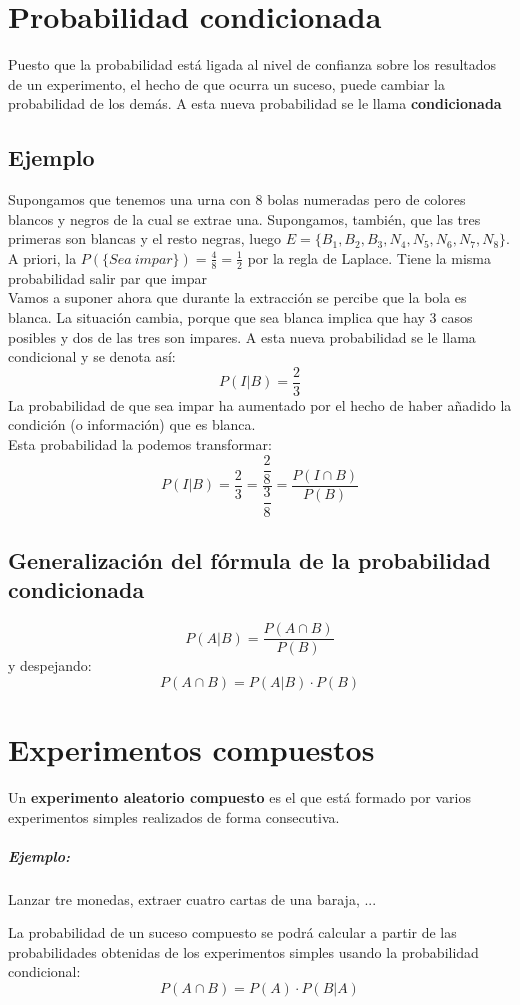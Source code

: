 \documentclass[a4paper,spanish,9pt]{extarticle}
\begin{document}
\begin{multicols*}{2}
\section{Probabilidad condicionada}

Puesto que la probabilidad está ligada al nivel de confianza sobre los resultados de un experimento, el hecho de que ocurra un suceso, puede cambiar la probabilidad de los demás. A esta nueva probabilidad se le llama \textbf{condicionada}
\subsection{Ejemplo}
 Supongamos que tenemos una urna con 8 bolas numeradas pero de colores blancos y negros de la cual se extrae una. Supongamos, también, que las tres primeras son blancas y el resto negras, luego  $E=\lbrace B_1,B_2, B_3, N_4, N_5, N_6, N_7, N_8\rbrace$.\\
 A priori, la $P(\lbrace Sea\ impar\rbrace )=\frac{4}{8}=\frac{1}{2}$ por la regla de Laplace. Tiene la misma probabilidad salir par que impar\\
 Vamos a suponer ahora que durante la extracción se percibe que la bola es blanca. La situación cambia, porque que sea blanca implica que hay 3 casos posibles y dos de las tres son impares. A esta nueva probabilidad se le llama  condicional y se denota así:
 $$P(I|B)=\dfrac{2}{3}$$
La probabilidad de que sea impar ha aumentado por el hecho de haber añadido la condición (o información) que es blanca.\\
Esta probabilidad la podemos transformar:
 $$P(I|B)=\dfrac{2}{3}=\dfrac{\dfrac{2}{8}}{\dfrac{3}{8}}=\dfrac{P(I\cap B)}{P(B)}$$

\subsection{Generalización del fórmula de la probabilidad condicionada}
$$P(A|B)=\dfrac{P(A\cap B)}{P(B)}$$
y despejando:
$$P(A\cap B) = P(A|B)\cdot P(B)$$

\section{Experimentos compuestos} Un \textbf{experimento aleatorio compuesto} es el que está formado por varios experimentos simples realizados de forma consecutiva.
\subparagraph{Ejemplo:}Lanzar tre monedas, extraer cuatro cartas de una baraja, ...

La probabilidad de un suceso compuesto se podrá calcular a partir de las probabilidades obtenidas de los experimentos simples usando la probabilidad condicional:
$$P(A\cap B) = P(A) \cdot P(B|A)$$


\end{multicols*}
\end{document}
